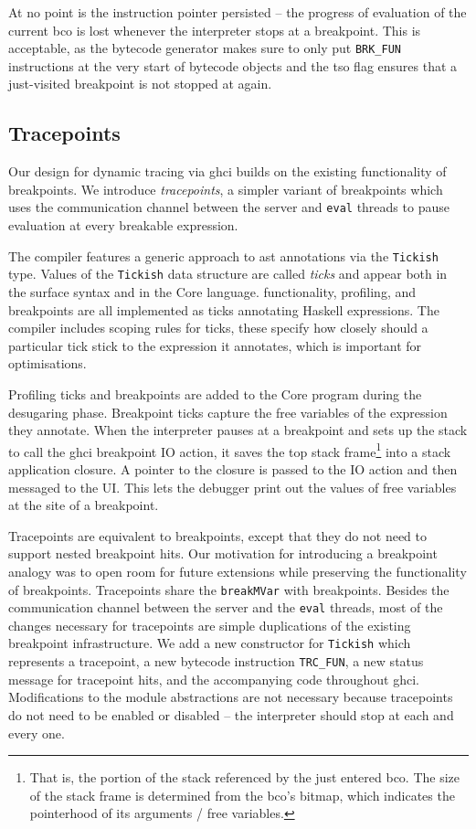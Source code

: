 \documentclass[thesis=B,english]{FITthesis}[2019/12/23]
\newcommand{\hsType}[1]{\texttt{#1}}
\newcommand{\hsIdent}[1]{\texttt{#1}}
\begin{document}
At no point is the instruction pointer persisted -- the progress of evaluation
of the current \acrshort{bco} is lost whenever the interpreter stops at a
breakpoint. This is acceptable, as the bytecode generator makes sure to only
put \texttt{BRK\_FUN} instructions at the very start of bytecode objects and
the \acrshort{tso} flag ensures that a just-visited breakpoint is not stopped
at again.

\subsection*{Trace\-points}
Our design for dynamic tracing via \acrshort{ghci} builds on the existing
functionality of breakpoints. We introduce \textit{trace\-points}, a simpler
variant of breakpoints which uses the communication channel between the server
and \texttt{eval} threads to pause evaluation at every breakable expression.

The compiler features a generic approach to \acrshort{ast} annotations via the
\hsType{Tickish} type. Values of the \hsType{Tickish} data structure are called
\textit{ticks} and appear both in the surface syntax and in the Core language.
 functionality, profiling, and breakpoints are all implemented
as ticks annotating Haskell expressions. The compiler includes scoping rules
for ticks, these specify how closely should a particular tick stick to the
expression it annotates, which is important for optimisations.

Profiling ticks and breakpoints are added to the Core program during the
desugaring phase. Breakpoint ticks capture the free variables of the expression
they annotate. When the interpreter pauses at a breakpoint and sets up the
stack to call the \acrshort{ghci} breakpoint IO action, it saves the top stack
frame\footnote{That is, the portion of the stack referenced by the just entered
\acrshort{bco}. The size of the stack frame is determined from the
\acrshort{bco}'s bitmap, which indicates the pointerhood of its arguments /
free variables.} into a stack application closure. A pointer to the closure is
passed to the IO action and then messaged to the UI. This lets the debugger
print out the values of free variables at the site of a breakpoint.

Tracepoints are equivalent to breakpoints, except that they do not need to
support nested breakpoint hits. Our motivation for introducing a breakpoint
analogy was to open room for future extensions while preserving the
functionality of breakpoints. Tracepoints share the \hsIdent{breakMVar} with
breakpoints. Besides the communication channel between the server and the
\texttt{eval} threads, most of the changes necessary for tracepoints are simple
duplications of the existing breakpoint infrastructure.  We add a new
constructor for \hsType{Tickish} which represents a tracepoint, a new bytecode
instruction \texttt{TRC\_FUN}, a new status message for tracepoint hits, and
the accompanying code throughout \acrshort{ghci}. Modifications to the module
abstractions are not necessary because tracepoints do not need to be enabled or
disabled -- the interpreter should stop at each and every one.
\end{document}

